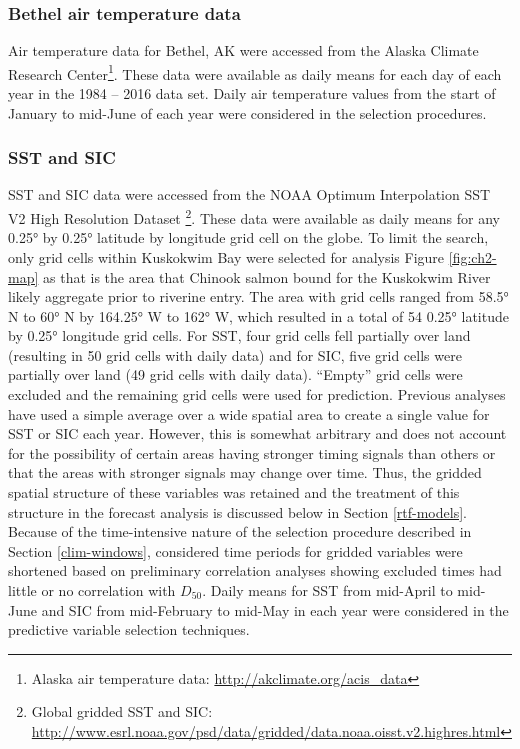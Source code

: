 \documentclass[12pt,]{book}
\let\rmarkdownfootnote\footnote%
\def\footnote{\protect\rmarkdownfootnote}
\theoremstyle{definition}
\theoremstyle{definition}
\theoremstyle{definition}
\theoremstyle{remark}
\begin{document}
\subsubsection{Bethel air temperature
data}\label{bethel-air-temperature-data}

\noindent
Air temperature data for Bethel, AK were accessed from the Alaska
Climate Research Center\footnote{Alaska air temperature data:
  \url{http://akclimate.org/acis_data}}. These data were available as
daily means for each day of each year in the 1984 -- 2016 data set.
Daily air temperature values from the start of January to mid-June of
each year were considered in the selection procedures.

\subsubsection{SST and SIC}\label{sst-and-sic}

\noindent
SST and SIC data were accessed from the NOAA Optimum Interpolation SST
V2 High Resolution Dataset \citep{reynolds-etal-2007}\footnote{Global
  gridded SST and SIC:
  \url{http://www.esrl.noaa.gov/psd/data/gridded/data.noaa.oisst.v2.highres.html}}.
These data were available as daily means for any 0.25° by 0.25° latitude
by longitude grid cell on the globe. To limit the search, only grid
cells within Kuskokwim Bay were selected for analysis Figure
\ref{fig:ch2-map} as that is the area that Chinook salmon bound for the
Kuskokwim River likely aggregate prior to riverine entry. The area with
grid cells ranged from 58.5° N to 60° N by 164.25° W to 162° W, which
resulted in a total of 54 0.25° latitude by 0.25° longitude grid cells.
For SST, four grid cells fell partially over land (resulting in 50 grid
cells with daily data) and for SIC, five grid cells were partially over
land (49 grid cells with daily data). ``Empty'' grid cells were excluded
and the remaining grid cells were used for prediction. Previous analyses
have used a simple average over a wide spatial area
\citep[e.g.,][]{mundy-evenson-2011} to create a single value for SST or
SIC each year. However, this is somewhat arbitrary and does not account
for the possibility of certain areas having stronger timing signals than
others or that the areas with stronger signals may change over time.
Thus, the gridded spatial structure of these variables was retained and
the treatment of this structure in the forecast analysis is discussed
below in Section \ref{rtf-models}. Because of the time-intensive nature
of the selection procedure described in Section \ref{clim-windows},
considered time periods for gridded variables were shortened based on
preliminary correlation analyses showing excluded times had little or no
correlation with \(D_{50}\). Daily means for SST from mid-April to
mid-June and SIC from mid-February to mid-May in each year were
considered in the predictive variable selection techniques.
\end{document}
